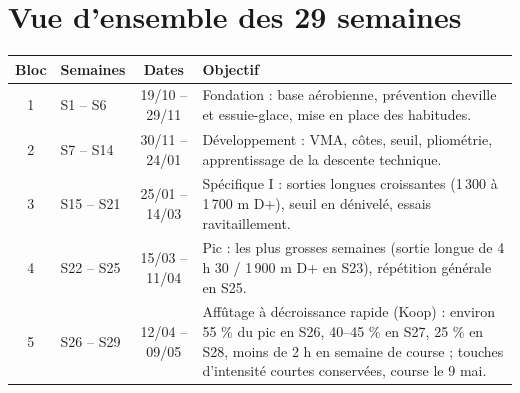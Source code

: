\documentclass[10pt,a4paper]{article}
\begin{document}
\section{Vue d'ensemble des 29 semaines}

\begin{center}
\begin{tabularx}{\textwidth}{@{}cl>{\small}cX@{}}
\toprule
\textbf{Bloc} & \textbf{Semaines} & \textbf{Dates} & \textbf{Objectif}\\
\midrule
\cellcolor{blue!8}1 & S1 -- S6 & 19/10 -- 29/11 & Fondation : base a\'erobienne, pr\'evention cheville et essuie-glace, mise en place des habitudes.\\
\cellcolor{blue!14}2 & S7 -- S14 & 30/11 -- 24/01 & D\'eveloppement : VMA, c\^otes, seuil, pliom\'etrie, apprentissage de la descente technique.\\
\cellcolor{blue!22}3 & S15 -- S21 & 25/01 -- 14/03 & Sp\'ecifique I : sorties longues croissantes (1\,300 \`a 1\,700 m D+), seuil en d\'enivel\'e, essais ravitaillement.\\
\cellcolor{blue!30}4 & S22 -- S25 & 15/03 -- 11/04 & Pic : les plus grosses semaines (sortie longue de 4 h 30 / 1\,900 m D+ en S23), r\'ep\'etition g\'en\'erale en S25.\\
\cellcolor{teal!16}5 & S26 -- S29 & 12/04 -- 09/05 & Aff\^utage \`a d\'ecroissance rapide (Koop) : environ 55 \% du pic en S26, 40--45 \% en S27, 25 \% en S28, moins de 2 h en semaine de course ; touches d'intensit\'e courtes conserv\'ees, course le 9 mai.\\
\bottomrule
\end{tabularx}
\end{center}
\end{document}
